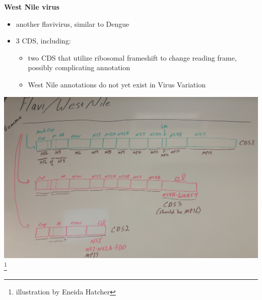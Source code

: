 \documentclass[landscape]{slides}
\begin{document}
\begin{slide}
\begin{center}
\textbf{West Nile virus}

\small  
\begin{itemize}
\item another flavivirus, similar to Dengue
\item 3 CDS, including:
\begin{itemize}
  \item two CDS that utilize ribosomal frameshift to change reading
    frame, \\ possibly complicating annotation
\item West Nile annotations do not yet exist in Virus Variation
\end{itemize}
\end{itemize}

\includegraphics[width=8in]{figs/flavi-wnv-eneida}\footnote{illustration
  by Eneida Hatcher}

\end{center}
\vfill

\end{slide}
\end{document}
